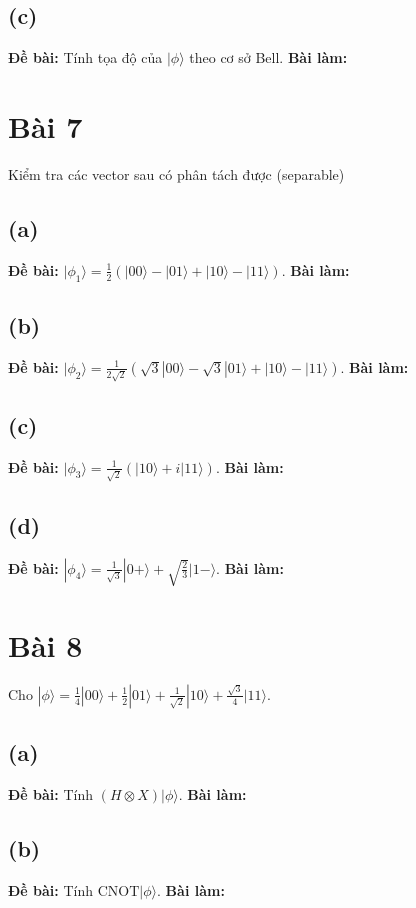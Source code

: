 \subsection{(c)}
\textbf{Đề bài:} Tính tọa độ của $|\phi\rangle$ theo cơ sở Bell.
\textbf{Bài làm:}

\section{Bài 7}
Kiểm tra các vector sau có phân tách được (separable)

\subsection{(a)}
\textbf{Đề bài:} $|\phi_{1}\rangle=\frac{1}{2}(|00\rangle-|01\rangle+|10\rangle-|11\rangle).$
\textbf{Bài làm:}

\subsection{(b)}
\textbf{Đề bài:} $|\phi_{2}\rangle=\frac{1}{2\sqrt{2}}(\sqrt{3}|00\rangle-\sqrt{3}|01\rangle+|10\rangle-|11\rangle)$.
\textbf{Bài làm:}

\subsection{(c)}
\textbf{Đề bài:} $|\phi_{3}\rangle=\frac{1}{\sqrt{2}}(|10\rangle+i|11\rangle)$.
\textbf{Bài làm:}

\subsection{(d)}
\textbf{Đề bài:} $|\phi_{4}\rangle=\frac{1}{\sqrt{3}}|0+\rangle+\sqrt{\frac{2}{3}}|1-\rangle$.
\textbf{Bài làm:}

\section{Bài 8}
Cho $|\phi\rangle=\frac{1}{4}|00\rangle+\frac{1}{2}|01\rangle+\frac{1}{\sqrt{2}}|10\rangle+\frac{\sqrt{3}}{4}|11\rangle$.

\subsection{(a)}
\textbf{Đề bài:} Tính $(H\otimes X)|\phi\rangle$.
\textbf{Bài làm:}

\subsection{(b)}
\textbf{Đề bài:} Tính $\mathrm{CNOT}|\phi\rangle$.
\textbf{Bài làm:}